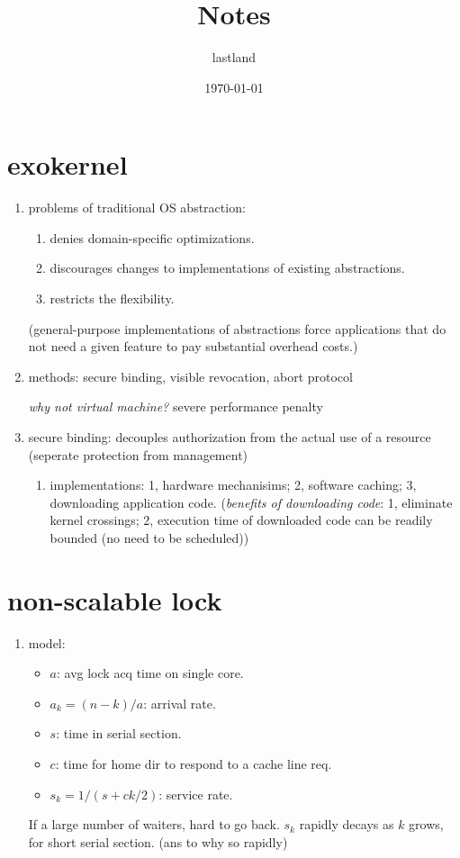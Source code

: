 \documentclass[9pt,conference]{IEEEtran}
\author{lastland}
\date{\today}
\title{Notes}
\begin{document}
\section{exokernel}
\label{sec-1}
\begin{enumerate}
\item problems of traditional OS abstraction:
\label{sec-1-1}
\begin{enumerate}
\item denies domain-specific optimizations.
\item discourages changes to implementations of existing abstractions.
\item restricts the flexibility.
\end{enumerate}
(general-purpose implementations of abstractions force applications that do not need a given feature to pay substantial overhead costs.)
\item methods:
\label{sec-1-2}
secure binding, visible revocation, abort protocol

\emph{why not virtual machine?} severe performance penalty
\item secure binding:
\label{sec-1-3}
decouples authorization from the actual use of a resource (seperate protection from management)
\begin{enumerate}
\item implementations:
\label{sec-1-3-1}
1, hardware mechanisims; 2, software caching; 3, downloading application code.
(\emph{benefits of downloading code}: 1, eliminate kernel crossings;
2, execution time of downloaded code can be readily bounded (no need to be scheduled))
\end{enumerate}
\end{enumerate}
\section{non-scalable lock}
\label{sec-2}
\begin{enumerate}
\item model:
\label{sec-2-1}
\begin{itemize}
\item $a$: avg lock acq time on single core.
\item $a_k = (n - k) / a$: arrival rate.
\item $s$: time in serial section.
\item $c$: time for home dir to respond to a cache line req.
\item $s_k = 1 / (s + ck / 2)$: service rate.
\end{itemize}
If a large number of waiters, hard to go back.
$s_k$ rapidly decays as $k$ grows, for short serial section. (ans to why so rapidly)
\end{enumerate}
\end{document}

